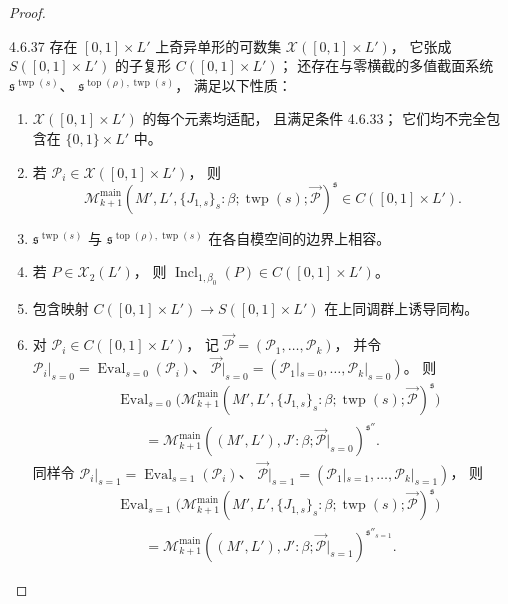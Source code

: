 \begin{proof}
\begin{proposition}{4.6.37}\label{prop:4-6-37}
存在 $[0,1]\times L'$ 上奇异单形的可数集
$\mathcal X([0,1]\times L')$，
它张成 $S([0,1]\times L')$ 的子复形
$C([0,1]\times L')$；
还存在与零横截的多值截面系统
$\mathfrak s^{\operatorname{twp}(s)}$、
$\mathfrak s^{\operatorname{top}(\rho),\operatorname{twp}(s)}$，
满足以下性质：
\begin{enumerate}[label=\textup{(4.6.38.\arabic*)},leftmargin=5.9em]
 \item
 $\mathcal X([0,1]\times L')$ 的每个元素均适配，
 且满足条件 4.6.33；
 它们均不完全包含在 $\{0,1\}\times L'$ 中。
 \item
 若 $\mathcal P_i\in\mathcal X([0,1]\times L')$，
 则
 \[
 \mathcal M_{k+1}^{\mathrm{main}}
 (M',L',\{J_{1,s}\}_s:
 \beta;\operatorname{twp}(s);\vec{\mathcal P})
 ^{\mathfrak s}
 \in C([0,1]\times L').
 \]
 \item
 $\mathfrak s^{\operatorname{twp}(s)}$
 与
 $\mathfrak s^{\operatorname{top}(\rho),\operatorname{twp}(s)}$
 在各自模空间的边界上相容。
 \item
 若 $P\in\mathcal X_2(L')$，
 则 $\operatorname{Incl}_{1,\beta_0}(P)
 \in C([0,1]\times L')$。
 \item
 包含映射
 $C([0,1]\times L')\to S([0,1]\times L')$
 在上同调群上诱导同构。
 \item
 对 $\mathcal P_i\in C([0,1]\times L')$，
 记 $\vec{\mathcal P}=(\mathcal P_1,\ldots,\mathcal P_k)$，
 并令
 $\mathcal P_i|_{s=0}
 =\operatorname{Eval}_{s=0}(\mathcal P_i)$、
 $\vec{\mathcal P}|_{s=0}
 =(\mathcal P_1|_{s=0},\ldots,\mathcal P_k|_{s=0})$。
 则
 \[
 \begin{aligned}
 &\operatorname{Eval}_{s=0}\!
 \bigl(\mathcal M_{k+1}^{\mathrm{main}}
 (M',L',\{J_{1,s}\}_s:
 \beta;\operatorname{twp}(s);
 \vec{\mathcal P})^{\mathfrak s}\bigr)\\
 &\qquad=
 \mathcal M_{k+1}^{\mathrm{main}}
 ((M',L'),J':\beta;
 \vec{\mathcal P}|_{s=0})^{\mathfrak s''}.
 \end{aligned}
 \]
 同样令
 $\mathcal P_i|_{s=1}
 =\operatorname{Eval}_{s=1}(\mathcal P_i)$、
 $\vec{\mathcal P}|_{s=1}
 =(\mathcal P_1|_{s=1},\ldots,\mathcal P_k|_{s=1})$，
 则
 \[
 \begin{aligned}
 &\operatorname{Eval}_{s=1}\!
 \bigl(\mathcal M_{k+1}^{\mathrm{main}}
 (M',L',\{J_{1,s}\}_s:
 \beta;\operatorname{twp}(s);
 \vec{\mathcal P})^{\mathfrak s}\bigr)\\
 &\qquad=
 \mathcal M_{k+1}^{\mathrm{main}}
 ((M',L'),J':\beta;
 \vec{\mathcal P}|_{s=1})^{\mathfrak s''_{s=1}}.

\end{aligned}\]
\end{enumerate}
\end{proposition}
\end{proof}
